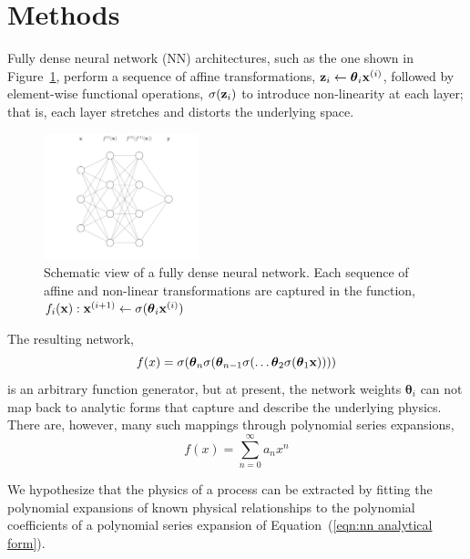 \section{Methods}\label{methods}

Fully dense neural network (NN) architectures, such as the one shown in Figure~\ref{fig:nn-1}, perform a sequence of affine transformations, ${\bold z}_i \leftarrow \boldsymbol\theta_i {\bold x}^{(i)}$, followed by element-wise functional operations, $\sigma({\bold z}_i)$ to introduce non-linearity at each layer; that is, each layer stretches and distorts the underlying space.
\begin{figure}[htbp]
\begin{center}
\includegraphics[width=0.4\textwidth]{fig/neural-network-01}
\caption{Schematic view of a fully dense neural network. Each sequence of affine and non-linear transformations are captured in the function, $f_i({\bold x}): {\bold x}^{(i+1)} \leftarrow \sigma(\boldsymbol\theta_i {\bold x}^{(i)})$}
\label{fig:nn-1}
\end{center}
\end{figure}

The resulting network,
\begin{equation}
	f(x) = \sigma(\boldsymbol\theta_n \sigma(\boldsymbol\theta_{n-1} \sigma(\ldots \boldsymbol\theta_2 \sigma(\boldsymbol\theta_1{\bold x}))))
	\label{eqn:nn analytical form}
\end{equation}
is an arbitrary function generator, but at present, the network weights $\boldsymbol\theta_i$ can not map back to analytic forms that capture and describe the underlying physics. There are, however, many such mappings through polynomial series expansions,
\begin{equation}
	f(x) = \sum_{n=0}^\infty a_n x^n
\end{equation}

We hypothesize that the physics of a process can be extracted by fitting the polynomial expansions of known physical relationships to the polynomial coefficients of a polynomial series expansion of Equation~(\ref{eqn:nn analytical form}).


